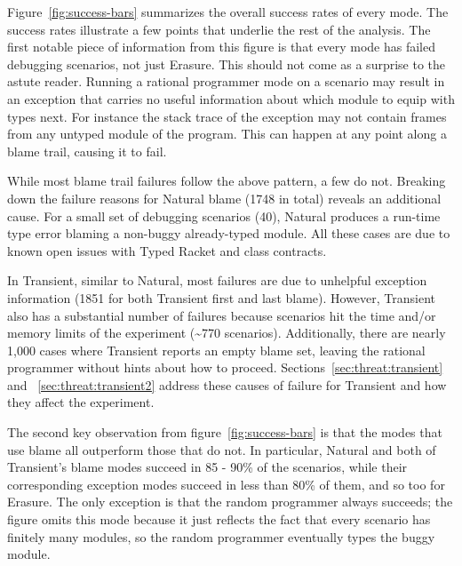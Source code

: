 

Figure~\ref{fig:success-bars} summarizes the overall success rates of
every mode.
The success rates illustrate a few points that underlie the
rest of the analysis.  The first notable piece of information from this
figure is that every mode has failed debugging scenarios, not just
Erasure. This should not come as a surprise to the astute reader.  Running
a rational programmer mode on a scenario may result in an exception
that carries no useful information about which module to equip with types next. For instance the stack trace of the exception may not
contain frames from any untyped module of the program. This can happen at any point
along a blame trail, causing it to fail.

While most blame trail failures follow the above pattern, a few do
not.  Breaking down the failure reasons for Natural blame (1748 in
total) reveals an additional cause. For a small set of debugging scenarios
(40), Natural produces a run-time type error blaming a non-buggy
already-typed module. All these cases are due to known open issues with Typed
Racket and class contracts. 

In Transient, similar to Natural, most failures are due to unhelpful exception
information (1851 for both Transient first and last blame).  However, Transient
also has a substantial number of failures because scenarios hit the time and/or
memory limits of the experiment (\textasciitilde770 scenarios).  Additionally,
there are nearly 1,000 cases where Transient reports an empty blame set, leaving
the rational programmer without hints about how to proceed.
Sections~\ref{sec:threat:transient} and ~\ref{sec:threat:transient2} address
these causes of failure for Transient and how they affect the experiment.

The second key observation from figure~\ref{fig:success-bars} is that the modes
that use blame all outperform those that do not. In particular, Natural and both
of Transient's blame modes succeed in 85 - 90\% of the scenarios, while their
corresponding exception modes succeed in less than 80\% of them, and so too for
Erasure. The only exception is that the random programmer always succeeds; the
figure omits this mode because it just reflects the fact that every scenario has
finitely many modules, so the random programmer eventually types the buggy
module.

